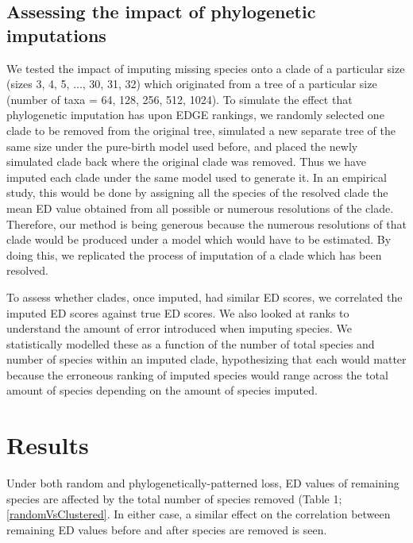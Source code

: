 \documentclass[12pt,english]{article}
\begin{document}
\subsection*{Assessing the impact of phylogenetic imputations}
We tested the impact of imputing missing species onto a clade of a particular
size (sizes 3, 4, 5, ..., 30, 31, 32) which originated from a tree of a
particular size (number of taxa = 64, 128, 256, 512, 1024). To simulate the
effect that phylogenetic imputation has upon EDGE rankings, we randomly selected
one clade to be removed from the original tree, simulated a new separate tree of
the same size under the pure-birth model used before, and placed the newly
simulated clade back where the original clade was removed. Thus we have imputed
each clade under the same model used to generate it. In an empirical study, this
would be done by assigning all the species of the resolved clade the mean ED
value obtained from all possible or numerous resolutions of the clade.
Therefore, our method is being generous because the numerous resolutions of that
clade would be produced under a model which would have to be estimated. By doing
this, we replicated the process of imputation of a clade which has been
resolved. 

To assess whether clades, once imputed, had similar ED scores, we
correlated the imputed ED scores against true ED scores. We also looked at ranks
to understand the amount of error introduced when imputing species. We
statistically modelled these as a function of the number of total species and
number of species within an imputed clade, hypothesizing that each would matter
because the erroneous ranking of imputed species would range across the total
amount of species depending on the amount of species imputed.

\section*{Results}
Under both random and phylogenetically-patterned loss, ED values of remaining
species are affected by the total number of species removed (Table 1;
\ref{randomVsClustered}. In either case, a similar effect on the correlation
between remaining ED values before and after species are removed is seen.   
\end{document}
